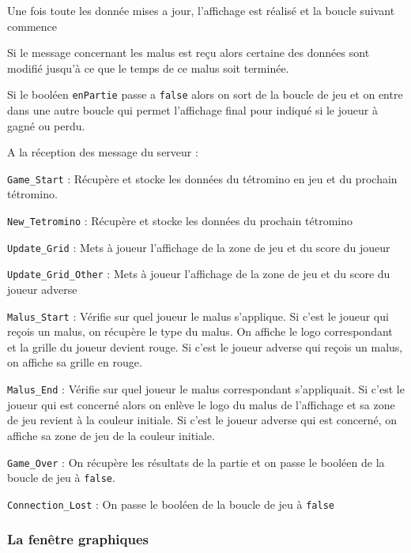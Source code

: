 \documentclass[a4paper, 12pt]{article}
\begin{document}
		Une fois toute les donnée mises a jour, l’affichage est réalisé et la boucle suivant commence

		Si le message concernant les malus est reçu alors certaine des données sont modifié jusqu’à ce que le temps de ce malus soit terminée.

		Si le booléen \texttt{enPartie} passe a \texttt{false} alors on sort de la boucle de jeu et on entre dans une autre boucle qui permet l’affichage final pour indiqué si le joueur à gagné ou perdu.

		A la réception des message du serveur :

		\texttt{Game\_Start} : 
		    Récupère et stocke les données du tétromino en jeu et du prochain tétromino.

		\texttt{New\_Tetromino} :
		    Récupère et stocke les données du prochain tétromino

		\texttt{Update\_Grid} : 
		    Mets à joueur l’affichage de la zone de jeu et du score du joueur

		\texttt{Update\_Grid\_Other} :
		    Mets à joueur l’affichage de la zone de jeu et du score du joueur adverse

		\texttt{Malus\_Start} : 
		    Vérifie sur quel joueur le malus s’applique.
		    Si c’est le joueur qui reçois un malus, on récupère le type du malus. On affiche le logo correspondant et la grille du joueur devient rouge.
		    Si c’est le joueur adverse qui reçois un malus, on affiche sa grille en rouge.

		\texttt{Malus\_End} :
		    Vérifie sur quel joueur le malus correspondant s’appliquait.
		    Si c’est le joueur qui est concerné alors on enlève le logo du malus de l’affichage et sa zone de jeu revient à la couleur initiale.
		    Si c’est le joueur adverse qui est concerné, on affiche sa zone de jeu de la couleur initiale.

		\texttt{Game\_Over} :
		    On récupère les résultats de la partie et on passe le booléen de la boucle de jeu à \texttt{false}.

		\texttt{Connection\_Lost} : 
		    On passe le booléen de la boucle de jeu à \texttt{false}
		    

		\subsubsection{La fenêtre graphiques}
\end{document}
